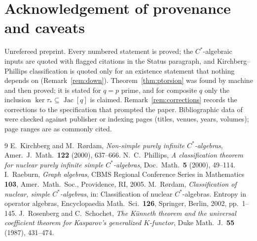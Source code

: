 \documentclass[11pt]{amsart}
\numberwithin{equation}{section}
\theoremstyle{definition}
\theoremstyle{remark}
\newcommand{\Jac}{\operatorname{Jac}}
\newcommand{\ta}{\tau_*}
\begin{document}
\section*{Acknowledgement of provenance and caveats}

Unrefereed preprint. Every numbered statement is proved; the $C^*$-algebraic inputs are
quoted with flagged citations in the Status paragraph, and Kirchberg--Phillips
classification is quoted only for an existence statement that nothing depends on
(Remark~\ref{rem:down}). Theorem~\ref{thm:ptorsion} was found by machine and then proved;
it is stated for $q=p$ prime, and for composite $q$ only the inclusion
$\ker\ta\subseteq\Jac[q]$ is claimed. Remark~\ref{rem:corrections} records the
corrections to the specification that prompted the paper. Bibliographic data of
\cite{R,Ph,Ro,RS} were checked against publisher or indexing pages (titles, venues,
years, volumes); page ranges are as commonly cited.

\begin{thebibliography}{9}
 E.~Kirchberg and M.~R\o rdam, \emph{Non-simple purely infinite
$C^*$-algebras}, Amer.\ J.\ Math.\ \textbf{122} (2000), 637--666.
 N.~C.~Phillips, \emph{A classification theorem for nuclear purely infinite
simple $C^*$-algebras}, Doc.\ Math.\ \textbf{5} (2000), 49--114.
 I.~Raeburn, \emph{Graph algebras}, CBMS Regional Conference Series in
Mathematics \textbf{103}, Amer.\ Math.\ Soc., Providence, RI, 2005.
 M.~R\o rdam, \emph{Classification of nuclear, simple $C^*$-algebras}, in:
Classification of nuclear $C^*$-algebras. Entropy in operator algebras, Encyclopaedia
Math.\ Sci.\ \textbf{126}, Springer, Berlin, 2002, pp.~1--145.
 J.~Rosenberg and C.~Schochet, \emph{The K\"unneth theorem and the universal
coefficient theorem for Kasparov's generalized $K$-functor}, Duke Math.\ J.\ \textbf{55}
(1987), 431--474.
\end{thebibliography}
\end{document}
